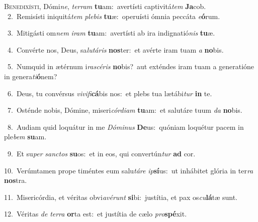 \lettrine{\initial\textcolor{\initialcolor}{B}}{enedixísti,} Dómi\-\textit{ne}\-, \textit{ter}\-\textit{ram} \textbf{tu}\-am:~\star avertísti captivitá\textit{tem} \textbf{Ja}\-cob.\\
{\numbfont\textcolor{\numbcolor}{~2.}}~Remisísti iniquitá\textit{tem} \textit{ple}\-\textit{bis} \textbf{tu}\-æ:~\star operuísti ómnia peccáta \textit{e}\-\textbf{ó}rum.\par
{\numbfont\textcolor{\numbcolor}{~3.}}~Mitigásti om\textit{nem} \textit{i}\-\textit{ram} \textbf{tu}\-am:~\star avertísti ab ira indignatió\textit{nis} \textbf{tu}\-æ.\par
{\numbfont\textcolor{\numbcolor}{~4.}}~Convérte nos, Deus, sa\-\textit{lu}\-\textit{tá}\textit{ris} \textbf{nos}\-ter:~\star et avérte iram tuam \textit{a} \textbf{no}\-bis.\par
{\numbfont\textcolor{\numbcolor}{~5.}}~Numquid in ætérnum i\-\textit{ra}\-\textit{scé}\textit{ris} \textbf{no}\-bis?~\star aut exténdes iram tuam a generatióne in genera\-\textit{ti}\-\textbf{ó}nem?\par
{\numbfont\textcolor{\numbcolor}{~6.}}~Deus, tu convérsus \textit{vi}\-\textit{vi}\textit{fi}\textbf{cá}bis nos:~\star et plebs tua lætábi\textit{tur} \textbf{in} te.\par
{\numbfont\textcolor{\numbcolor}{~7.}}~Osténde nobis, Dómine, miseri\-\textit{cór}\-\textit{di}\textit{am} \textbf{tu}\-am:~\star et salutáre tuum \textit{da} \textbf{no}\-bis.\par
{\numbfont\textcolor{\numbcolor}{~8.}}~Audiam quid loquátur in me \textit{Dó}\-\textit{mi}\textit{nus} \textbf{De}\-us:~\star quóniam loquétur pacem in ple\textit{bem} \textbf{su}\-am.\par
{\numbfont\textcolor{\numbcolor}{~9.}}~Et su\textit{per} \textit{sanc}\-\textit{tos} \textbf{su}\-os:~\star et in eos, qui convertún\textit{tur} \textbf{ad} cor.\par
{\numbfont\textcolor{\numbcolor}{10.}}~Verúmtamen prope timéntes eum salu\-\textit{tá}\-\textit{re} \textit{ip}\-\textbf{sí}us:~\star ut inhábitet glória in ter\textit{ra} \textbf{nos}\-tra.\par
{\numbfont\textcolor{\numbcolor}{11.}}~Misericórdia, et véritas obvi\-\textit{a}\-\textit{vé}\textit{runt} \textbf{si}\-bi:~\star justítia, et pax os\-\textit{cu}\-\textbf{lá}tæ sunt.\par
{\numbfont\textcolor{\numbcolor}{12.}}~Véritas \textit{de} \textit{ter}\-\textit{ra} \textbf{or}\-ta est:~\star et justítia de cælo \textit{pro}\-\textbf{spé}xit.\par
